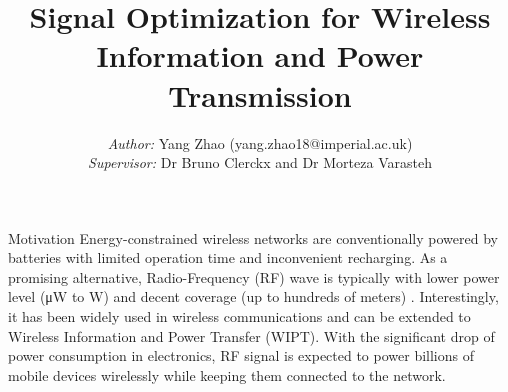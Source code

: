 \documentclass[xcolor={table}]{beamer}
\title{Signal Optimization for Wireless Information and Power Transmission}
\author{\textit{Author:} Yang Zhao (yang.zhao18@imperial.ac.uk) \\
        \textit{Supervisor:} Dr Bruno Clerckx and Dr Morteza Varasteh}
\begin{document}
\begin{frame}[fragile=singleslide,t]\centering

\maketitle


\begin{block}{Motivation}
Energy-constrained wireless networks are conventionally powered by batteries with limited operation time and inconvenient recharging. As a promising alternative, Radio-Frequency (RF) wave is typically with lower power level (\si{\uW} to \si{W}) and decent coverage (up to hundreds of meters) \citep{Ng2019}. Interestingly, it has been widely used in wireless communications and can be extended to Wireless Information and Power Transfer (WIPT). With the significant drop of power consumption in electronics, RF signal is expected to power billions of mobile devices wirelessly while keeping them connected to the network.
\end{block}

\begin{columns}[onlytextwidth,T]

\begin{column}{.47\textwidth}


\end{column}
\end{columns}
\end{frame}
\end{document}
